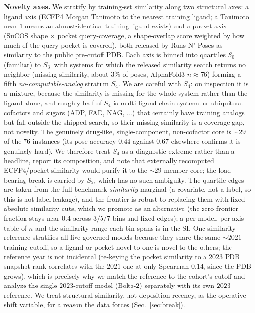 \documentclass[10pt]{article}
\begin{document}
\textbf{Novelty axes.} We stratify by training-set similarity along two structural axes: a ligand axis
(ECFP4 Morgan Tanimoto to the nearest training ligand; a Tanimoto near $1$ means an almost-identical
training ligand exists) and a pocket axis (SuCOS shape $\times$ pocket query-coverage, a shape-overlap
score weighted by how much of the query pocket is covered), both released by Runs N' Poses as similarity to
the public pre-cutoff PDB. Each axis is binned into quartiles $S_0$ (familiar) to $S_3$, with systems for which the released similarity
search returns no neighbor (missing similarity, about $3\%$ of poses, AlphaFold3 $n\!\approx\!76$) forming a
fifth \emph{no-computable-analog} stratum $S_4$. We are careful with $S_4$: on inspection it is a mixture,
because the similarity is missing for the whole system rather than the ligand alone, and roughly half of
$S_4$ is multi-ligand-chain systems or ubiquitous cofactors and sugars (ADP, FAD, NAG, $\dots$) that
certainly have training analogs but fall outside the shipped search, so their missing similarity is a
coverage gap, not novelty. The genuinely drug-like, single-component, non-cofactor core is $\sim\!29$ of the
$76$ instances (its pose accuracy $0.44$ against $0.67$ elsewhere confirms it is genuinely hard). We
therefore treat $S_4$ as a diagnostic extreme rather than a headline, report its composition, and note that
externally recomputed ECFP4/pocket similarity would purify it to the $\sim\!29$-member core; the load-bearing
break is carried by $S_3$, which has no such ambiguity. The quartile edges are taken from the full-benchmark
\emph{similarity} marginal (a covariate, not a label, so this is not label leakage), and the frontier is
robust to replacing them with fixed absolute similarity cuts, which we promote as an alternative (the
zero-frontier fraction stays near $0.4$ across $3/5/7$ bins and fixed edges); a per-model, per-axis table of $n$ and the
similarity range each bin spans is in the SI. One similarity reference stratifies
all five governed models because they share the same $\sim\!2021$ training cutoff, so a ligand or pocket
novel to one is novel to the others; the reference year is not incidental (re-keying the pocket similarity
to a $2023$ PDB snapshot rank-correlates with the $2021$ one at only Spearman $0.14$, since the PDB grows),
which is precisely why we match the reference to the cohort's cutoff and analyze the single $2023$-cutoff
model (Boltz-2) separately with its own $2023$ reference. We treat structural similarity, not deposition
recency, as the operative shift variable, for a reason the data forces (Sec.~\ref{sec:break}).
\end{document}

